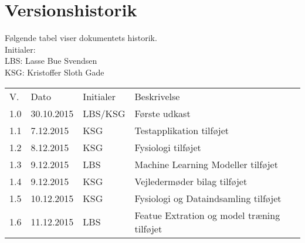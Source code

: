 \documentclass[pdftex, 11pt, a4paper, twoside, danish]{memoir}
\begin{document}
    \begin{titlingpage}
%        
    \end{titlingpage}
    
    
    
    
    \bgroup
	    \hypersetup{linkcolor=black}
	    \tableofcontents*	%
    \egroup
    \section*{Versionshistorik}
    Følgende tabel viser dokumentets historik.\\    
    Initialer:\\
    LBS: Lasse Bue Svendsen\\
    KSG: Kristoffer Sloth Gade
    \bgroup
    \def\arraystretch{1.8}
    \begin{center}
    	\begin{tabular}{lllp{206pt}}
    		\rowcolor{grey} V.	& Dato 		& Initialer & Beskrivelse \\
    		1.0	& 30.10.2015 	& LBS/KSG	& Første udkast\\
    		1.1	& 7.12.2015 	& KSG		& Testapplikation tilføjet\\
    		1.2 & 8.12.2015		& KSG		& Fysiologi tilføjet\\
    		1.3	& 9.12.2015		& LBS		& Machine Learning Modeller tilføjet\\
    		1.4 & 9.12.2015		& KSG		& Vejledermøder bilag tilføjet\\
    		1.5 & 10.12.2015	& KSG		& Fysiologi og Dataindsamling tilføjet\\
    		1.6 & 11.12.2015	& LBS		& Featue Extration og model træning tilføjet
    	\end{tabular}
    \end{center}
    \egroup
    
    
    
    
    
    
    
    
    
    
    
    
    
    
    
    
        
    
    
    
    


    
    \listoftodos
\end{document}
